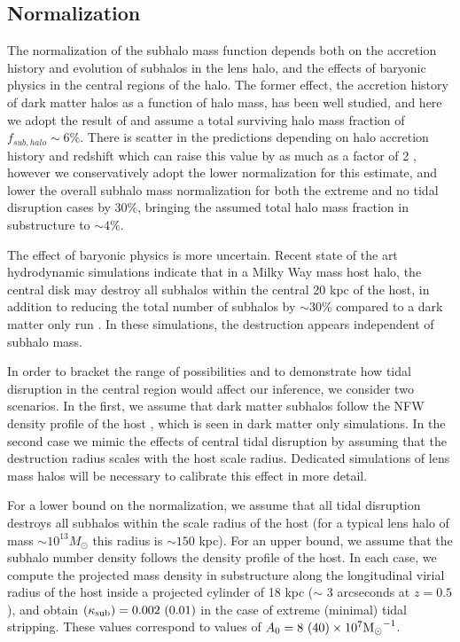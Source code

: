 \subsection{Normalization}

The normalization of the subhalo mass function depends both on the accretion history and evolution of subhalos in the lens halo, and the effects of baryonic physics in the central regions of the halo. The former effect, the accretion history of dark matter halos as a function of halo mass, has been well studied, and here we adopt the result of \cite{Han++16} and assume a total surviving halo mass fraction of $f_{sub, halo} \sim 6\%$. There is scatter in the predictions depending on halo accretion history and redshift which can raise this value by as much as a factor of 2 \cite{Fiacconi++16,JiangvdB17}, however we conservatively adopt the lower normalization for this estimate, and lower the overall subhalo mass normalization for both the extreme and no tidal disruption cases by $30\%$, bringing the assumed total halo mass fraction in substructure to $\sim 4\%$.

The effect of baryonic physics is more uncertain. Recent state of the art hydrodynamic simulations indicate that in a Milky Way mass host halo, the central disk may destroy all subhalos within the central 20 kpc of the host, in addition to reducing the total number of subhalos by $\sim30\%$ compared to a dark matter only run \cite{GK++17}. In these simulations, the destruction appears independent of subhalo mass.

In order to bracket the range of possibilities and to demonstrate how tidal disruption in the central region would affect our inference, we consider two scenarios. In the first, we assume that dark matter subhalos follow the NFW density profile of the host \cite{Han++16}, which is seen in dark matter only simulations. In the second case we mimic the effects of central tidal disruption by assuming that the destruction radius scales with the host scale radius. Dedicated simulations of lens mass halos will be necessary to calibrate this effect in more detail.

For a lower bound on the normalization, we assume that all tidal disruption destroys all subhalos within the scale radius of the host (for a typical lens halo of mass $\sim 10^{13}M_{\odot}$ this radius is $\sim 150$ kpc). For an upper bound, we assume that the subhalo number density follows the density profile of the host. In each case, we compute the projected mass density in substructure along the longitudinal virial radius of the host inside a projected cylinder of 18 kpc ($\sim$ 3 arcseconds at $z = 0.5$), and obtain $\left(\kappa_{\rm{sub}}\right) = 0.002 \ (0.01)$ in the case of extreme (minimal) tidal stripping. These values correspond to values of $A_0 =   8 \ (40) \times 10^7 {\rm{M}_{\odot}}^{-1}$.

